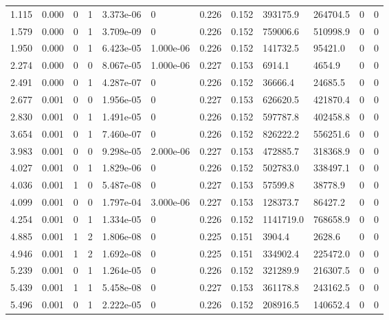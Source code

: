 \documentclass[preview]{standalone}
\begin{document}
{{\begin{tabular}{L{1.2cm}C{1.2cm} C{0.3cm}C{0.5cm} C{1.4cm}C{1.4cm} C{1.4cm}C{1.4cm} C{1.6cm}C{1.6cm} C{1.6cm}C{1.6cm}}
  1.115  &  0.000  & 0     &  1 &  3.373e-06  & 0  &  0.226&   0.152& 393175.9 & 264704.5   &  0 & 0  \\ 
  1.579  &  0.000  & 0     &  1 &  3.709e-09  & 0  &  0.226&   0.152& 759006.6 & 510998.9   &  0 & 0  \\ 
  1.950  &  0.000  & 0     &  1 &  6.423e-05  & 1.000e-06  &  0.226&   0.152& 141732.5 & 95421.0   &  0 & 0  \\ 
  2.274  &  0.000  & 0     &  0 &  8.067e-05  & 1.000e-06  &  0.227&   0.153& 6914.1 & 4654.9   &  0 & 0  \\ 
  2.491  &  0.000  & 0     &  1 &  4.287e-07  & 0  &  0.226&   0.152& 36666.4 & 24685.5   &  0 & 0  \\ 
  2.677  &  0.001  & 0     &  0 &  1.956e-05  & 0  &  0.227&   0.153& 626620.5 & 421870.4   &  0 & 0  \\ 
  2.830  &  0.001  & 0     &  1 &  1.491e-05  & 0  &  0.226&   0.152& 597787.8 & 402458.8   &  0 & 0  \\ 
  3.654  &  0.001  & 0     &  1 &  7.460e-07  & 0  &  0.226&   0.152& 826222.2 & 556251.6   &  0 & 0  \\ 
  3.983  &  0.001  & 0     &  0 &  9.298e-05  & 2.000e-06  &  0.227&   0.153& 472885.7 & 318368.9   &  0 & 0  \\ 
  4.027  &  0.001  & 0     &  1 &  1.829e-06  & 0  &  0.226&   0.152& 502783.0 & 338497.1   &  0 & 0  \\ 
  4.036  &  0.001  & 1     &  0 &  5.487e-08  & 0  &  0.227&   0.153& 57599.8 & 38778.9   &  0 & 0  \\ 
  4.099  &  0.001  & 0     &  0 &  1.797e-04  & 3.000e-06  &  0.227&   0.153& 128373.7 & 86427.2   &  0 & 0  \\ 
  4.254  &  0.001  & 0     &  1 &  1.334e-05  & 0  &  0.226&   0.152& 1141719.0 & 768658.9   &  0 & 0  \\ 
  4.885  &  0.001  & 1     &  2 &  1.806e-08  & 0  &  0.225&   0.151& 3904.4 & 2628.6   &  0 & 0  \\ 
  4.946  &  0.001  & 1     &  2 &  1.692e-08  & 0  &  0.225&   0.151& 334902.4 & 225472.0   &  0 & 0  \\ 
  5.239  &  0.001  & 0     &  1 &  1.264e-05  & 0  &  0.226&   0.152& 321289.9 & 216307.5   &  0 & 0  \\ 
  5.439  &  0.001  & 1     &  1 &  5.458e-08  & 0  &  0.227&   0.153& 361178.8 & 243162.5   &  0 & 0  \\ 
  5.496  &  0.001  & 0     &  1 &  2.222e-05  & 0  &  0.226&   0.152& 208916.5 & 140652.4   &  0 & 0  \\ 

\end{tabular}}}
\end{document}
